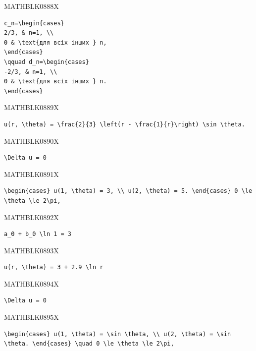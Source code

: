 \documentclass[
  ukrainian,
]{article}
\begin{document}
MATHBLK0888X

\begin{verbatim}
c_n=\begin{cases}
2/3, & n=1, \\
0 & \text{для всіх інших } n,
\end{cases}
\qquad d_n=\begin{cases}
-2/3, & n=1, \\
0 & \text{для всіх інших } n.
\end{cases}
\end{verbatim}

MATHBLK0889X

\begin{verbatim}
u(r, \theta) = \frac{2}{3} \left(r - \frac{1}{r}\right) \sin \theta.
\end{verbatim}

MATHBLK0890X

\begin{verbatim}
\Delta u = 0
\end{verbatim}

MATHBLK0891X

\begin{verbatim}
\begin{cases} u(1, \theta) = 3, \\ u(2, \theta) = 5. \end{cases} 0 \le \theta \le 2\pi,
\end{verbatim}

MATHBLK0892X

\begin{verbatim}
a_0 + b_0 \ln 1 = 3
\end{verbatim}

MATHBLK0893X

\begin{verbatim}
u(r, \theta) = 3 + 2.9 \ln r
\end{verbatim}

MATHBLK0894X

\begin{verbatim}
\Delta u = 0
\end{verbatim}

MATHBLK0895X

\begin{verbatim}
\begin{cases} u(1, \theta) = \sin \theta, \\ u(2, \theta) = \sin \theta. \end{cases} \quad 0 \le \theta \le 2\pi,
\end{verbatim}
\end{document}
